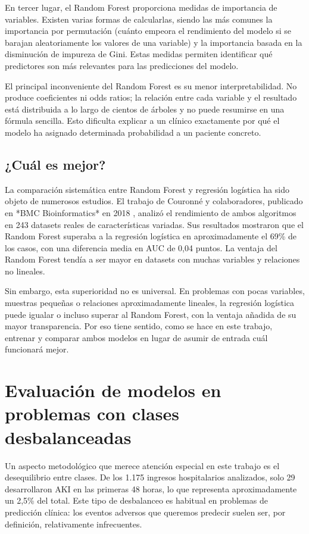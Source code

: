 \documentclass[12pt, a4paper, oneside]{report}
\begin{document}
En tercer lugar, el Random Forest proporciona medidas de importancia de variables. Existen varias formas de calcularlas, siendo las más comunes la importancia por permutación (cuánto empeora el rendimiento del modelo si se barajan aleatoriamente los valores de una variable) y la importancia basada en la disminución de impureza de Gini. Estas medidas permiten identificar qué predictores son más relevantes para las predicciones del modelo.

El principal inconveniente del Random Forest es su menor interpretabilidad. No produce coeficientes ni odds ratios; la relación entre cada variable y el resultado está distribuida a lo largo de cientos de árboles y no puede resumirse en una fórmula sencilla. Esto dificulta explicar a un clínico exactamente por qué el modelo ha asignado determinada probabilidad a un paciente concreto.

\subsection{¿Cuál es mejor?} 

La comparación sistemática entre Random Forest y regresión logística ha sido objeto de numerosos estudios. El trabajo de Couronné y colaboradores, publicado en *BMC Bioinformatics* en 2018 \parencite{couronne2018rflr}, analizó el rendimiento de ambos algoritmos en 243 datasets reales de características variadas. Sus resultados mostraron que el Random Forest superaba a la regresión logística en aproximadamente el 69\% de los casos, con una diferencia media en AUC de 0,04 puntos. La ventaja del Random Forest tendía a ser mayor en datasets con muchas variables y relaciones no lineales.

Sin embargo, esta superioridad no es universal. En problemas con pocas variables, muestras pequeñas o relaciones aproximadamente lineales, la regresión logística puede igualar o incluso superar al Random Forest, con la ventaja añadida de su mayor transparencia. Por eso tiene sentido, como se hace en este trabajo, entrenar y comparar ambos modelos en lugar de asumir de entrada cuál funcionará mejor.

\section{Evaluación de modelos en problemas con clases desbalanceadas}

Un aspecto metodológico que merece atención especial en este trabajo es el desequilibrio entre clases. De los 1.175 ingresos hospitalarios analizados, solo 29 desarrollaron AKI en las primeras 48 horas, lo que representa aproximadamente un 2,5\% del total. Este tipo de desbalanceo es habitual en problemas de predicción clínica: los eventos adversos que queremos predecir suelen ser, por definición, relativamente infrecuentes.
\end{document}
